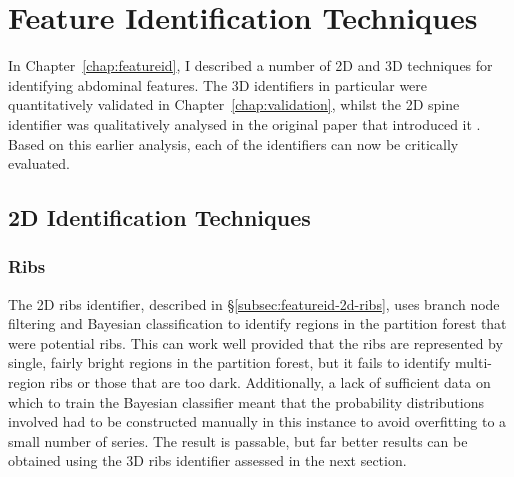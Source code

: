 \section{Feature Identification Techniques}

In Chapter~\ref{chap:featureid}, I described a number of 2D and 3D techniques for identifying abdominal features. The 3D identifiers in particular were quantitatively validated in Chapter~\ref{chap:validation}, whilst the 2D spine identifier was qualitatively analysed in the original paper that introduced it \cite{gvcispa09}. Based on this earlier analysis, each of the identifiers can now be critically evaluated.

\subsection{2D Identification Techniques}

\subsubsection{Ribs}

The 2D ribs identifier, described in \S\ref{subsec:featureid-2d-ribs}, uses branch node filtering and Bayesian classification to identify regions in the partition forest that were potential ribs. This can work well provided that the ribs are represented by single, fairly bright regions in the partition forest, but it fails to identify multi-region ribs or those that are too dark. Additionally, a lack of sufficient data on which to train the Bayesian classifier meant that the probability distributions involved had to be constructed manually in this instance to avoid overfitting to a small number of series. The result is passable, but far better results can be obtained using the 3D ribs identifier assessed in the next section.

